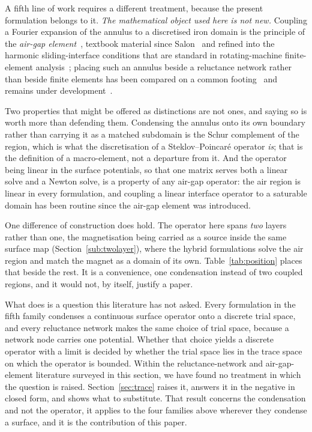 \documentclass[10pt,a4paper,twocolumn]{article}
\theoremstyle{plain}
\theoremstyle{remark}
\begin{document}
A fifth line of work requires a different treatment, because the present
formulation belongs to it. \emph{The mathematical object used here is not
new.} Coupling a Fourier expansion of the annulus to a discretised iron
domain is the principle of the \emph{air-gap
element}~\cite{abdelrazek1982}, textbook material since
Salon~\cite{salon1995} and refined into the harmonic sliding-interface
conditions that are standard in rotating-machine finite-element
analysis~\cite{degersem2004}; placing such an annulus beside a
reluctance network rather than beside finite elements has been compared
on a common footing~\cite{ouagued2016} and remains under
development~\cite{belmahi2026}.

Two properties that might be offered as distinctions are not ones, and
saying so is worth more than defending them. Condensing the annulus onto
its own boundary rather than carrying it as a matched subdomain is the
Schur complement of the region, which is what the discretisation of a
Steklov--Poincar\'e operator \emph{is}; that is the definition of a
macro-element, not a departure from it. And the operator being linear in
the surface potentials, so that one matrix serves both a linear solve
and a Newton solve, is a property of any air-gap operator: the air
region is linear in every formulation, and coupling a linear interface
operator to a saturable domain has been routine since the air-gap
element was introduced.

One difference of construction does hold. The operator here spans
\emph{two} layers rather than one, the magnetisation being carried as a
source inside the same surface map (Section~\ref{sub:twolayer}), where
the hybrid formulations solve the air region and match the magnet as a
domain of its own. Table~\ref{tab:position} places that beside the rest.
It is a convenience, one condensation instead of two coupled
regions, and it would not, by itself, justify a paper.

What does is a question this literature has not asked. Every formulation
in the fifth family condenses a continuous surface operator onto a
discrete trial space, and every reluctance network makes the same choice
of trial space, because a network node carries one potential. Whether
that choice yields a discrete operator with a limit is decided by
whether the trial space lies in the trace space on which the operator is
bounded. Within the reluctance-network and air-gap-element literature
surveyed in this section, we have found no treatment in which the
question is raised.
Section~\ref{sec:trace} raises it, answers it in the negative in closed
form, and shows what to substitute. That result concerns the
condensation and not the operator, it applies to the four families above
wherever they condense a surface, and it is the contribution of this
paper.
\end{document}
